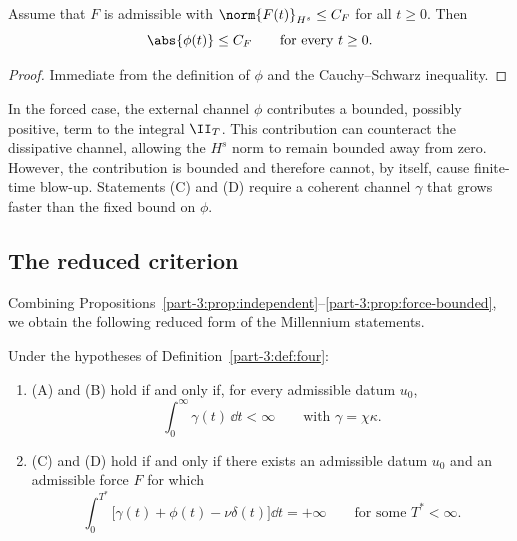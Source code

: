 \begin{proposition}\label{part-3:prop:force-bounded}
Assume that $F$ is admissible with $\norm{F(t)}_{H^s}\leq C_F$ for 
all $t\geq 0$. Then
\begin{equation}\label{part-3:eq:phi-bound}
\abs{\phi(t)}\leq C_F
\qquad\text{for every }t\geq 0.
\end{equation}
\end{proposition}

\begin{proof}
Immediate from the definition of $\phi$ and the Cauchy--Schwarz 
inequality.
\end{proof}

\begin{remark}\label{part-3:rem:force-role}
In the forced case, the external channel $\phi$ contributes a 
bounded, possibly positive, term to the integral $\II_T$. This 
contribution can counteract the dissipative channel, allowing the 
$H^s$ norm to remain bounded away from zero. However, the 
contribution is bounded and therefore cannot, by itself, cause 
finite-time blow-up. Statements (C) and (D) require a coherent 
channel $\gamma$ that grows faster than the fixed bound on $\phi$.
\end{remark}

\subsection{The reduced criterion}
\label{part-3:ssec:reduced-criterion}

Combining Propositions~\ref{part-3:prop:independent}--\ref{part-3:prop:force-bounded}, 
we obtain the following reduced form of the Millennium statements.

\begin{theorem}\label{part-3:thm:reduced}
Under the hypotheses of Definition~\ref{part-3:def:four}:
\begin{enumerate}[label=(\roman*),leftmargin=*]
\item (A) and (B) hold if and only if, for every admissible datum 
      $u_0$,
      \begin{equation}\label{part-3:eq:reduced-AB}
      \int_0^\infty \gamma(t)\,\dd t < \infty
      \qquad\text{with }\gamma = \chi\kappa.
      \end{equation}
\item (C) and (D) hold if and only if there exists an admissible 
      datum $u_0$ and an admissible force $F$ for which
      \begin{equation}\label{part-3:eq:reduced-CD}
      \int_0^{T^\ast}\bigl[\gamma(t) + \phi(t) - \nu\delta(t)\bigr]
      \dd t = +\infty
      \qquad\text{for some }T^\ast<\infty.
      \end{equation}
\end{enumerate}
\end{theorem}

